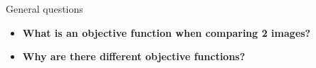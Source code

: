 \documentclass{beamer}
\begin{document}
\begin{frame}{General questions}
  \begin{itemize}
    \item \textbf{What is an objective function when comparing 2 images?}


    \bigskip
    \item \textbf{Why are there different objective functions?}

  \end{itemize}
\end{frame}

%
%
%
\end{document}
